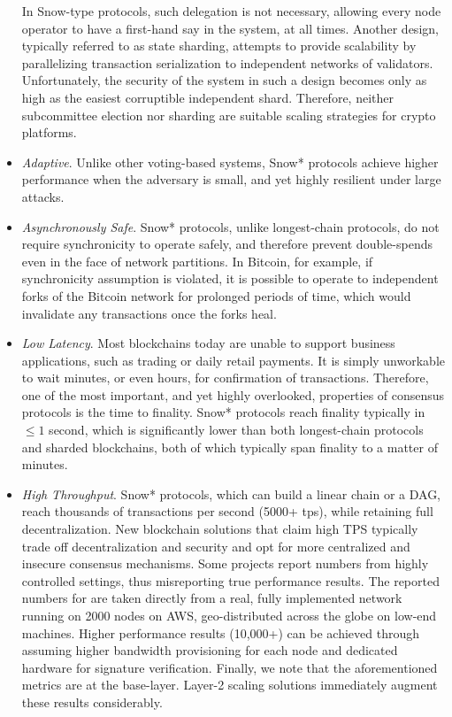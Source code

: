 \documentclass[runningheads]{llncs}
\begin{document}
\begin{itemize}
In Snow-type protocols, such delegation is not necessary, allowing every node operator to have a first-hand say in the system, at all times. Another design, typically referred to as state sharding, attempts to provide scalability by parallelizing transaction serialization to independent networks of validators. Unfortunately, the security of the system in such a design becomes only as high as the easiest corruptible independent shard. Therefore, neither subcommittee election nor sharding are suitable scaling strategies for crypto platforms. 
\item \textit{Adaptive}. Unlike other voting-based systems, Snow* protocols achieve higher performance when the adversary is small, and yet highly resilient under large attacks. 
\item \textit{Asynchronously Safe}. Snow* protocols, unlike longest-chain protocols, do not require synchronicity to operate safely, and therefore prevent double-spends even in the face of network partitions. In Bitcoin, for example, if synchronicity assumption is violated, it is possible to operate to independent forks of the Bitcoin network for prolonged periods of time, which would invalidate any transactions once the forks heal. 
\item \textit{Low Latency}. Most blockchains today are unable to support business applications, such as trading or daily retail payments. It is simply unworkable to wait minutes, or even hours, for confirmation of transactions. Therefore, one of the most important, and yet highly overlooked, properties of consensus protocols is the time to finality. Snow* protocols reach finality typically in $\leq 1$ second, which is significantly lower than both longest-chain protocols and sharded blockchains, both of which typically span finality to a matter of minutes. 
\item \textit{High Throughput}. Snow* protocols, which can build a linear chain or a DAG, reach thousands of transactions per second (5000+ tps), while retaining full decentralization. New blockchain solutions that claim high TPS typically trade off decentralization and security and opt for more centralized and insecure consensus mechanisms. Some projects report numbers from highly controlled settings, thus misreporting true performance results. The reported numbers for \AVATokenName{} are taken directly from a real, fully implemented \AVAPlatformName{} network running on 2000 nodes on AWS, geo-distributed across the globe on low-end machines. Higher performance results (10,000+) can be achieved through assuming higher bandwidth provisioning for each node and dedicated hardware for signature verification. Finally, we note that the aforementioned metrics are at the base-layer. Layer-2 scaling solutions immediately augment these results considerably. 
\end{itemize}
\end{document}
